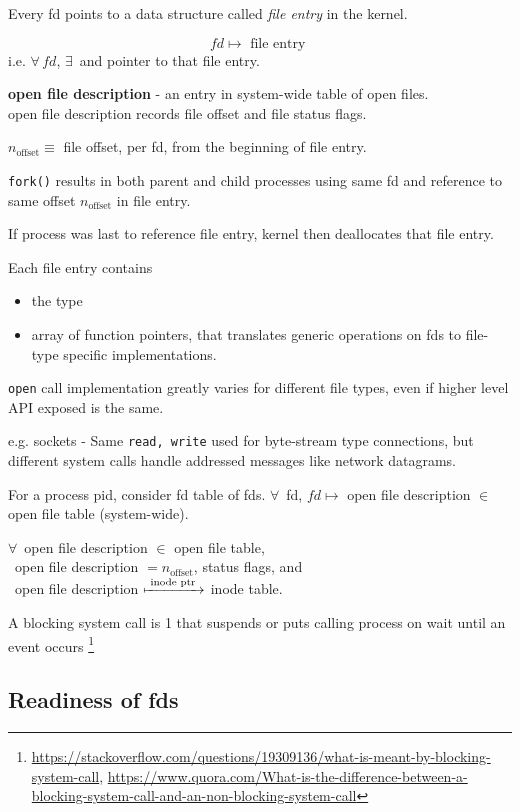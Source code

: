 \documentclass[10pt]{amsart}
\begin{document}
Every fd points to a data structure called \emph{file entry} in the kernel.

\[
fd \mapsto \text{ file entry }
\]
i.e. $\forall \, fd$, $\exists \,$  and pointer to that file entry.


\textbf{open file description} - an entry in system-wide table of open files. \\
open file description records file offset and file status flags.

$n_{\text{offset}} \equiv $ file offset, per fd, from the beginning of file entry.

\texttt{fork()} results in both parent and child processes using same fd and reference to same offset $n_{\text{offset}}$ in file entry.

If process was last to reference file entry, kernel then deallocates that file entry.


Each file entry contains
\begin{itemize}
	\item the type
	\item array of function pointers, that translates generic operations on fds to file-type specific implementations.
\end{itemize}

\texttt{open} call implementation greatly varies for different file types, even if higher level API exposed is the same.

e.g. sockets - Same \texttt{read, write} used for byte-stream type connections, but different system calls handle addressed messages like network datagrams.


For a process pid, consider fd table of fds. $\forall \, $ fd, $fd \mapsto $ open file description $\in$ open file table (system-wide).

$\forall \, $ open file description $\in $ open file table, \\
\qquad \, open file description $= n_{\text{offset}}$, status flags, and \\
\qquad \, open file description $\xmapsto{ \text{ inode ptr } }$ inode table.

A blocking system call is 1 that suspends or puts calling process on wait until an event occurs \footnote{\url{https://stackoverflow.com/questions/19309136/what-is-meant-by-blocking-system-call}, \url{https://www.quora.com/What-is-the-difference-between-a-blocking-system-call-and-an-non-blocking-system-call}}

\subsection{Readiness of fds}
\end{document}
